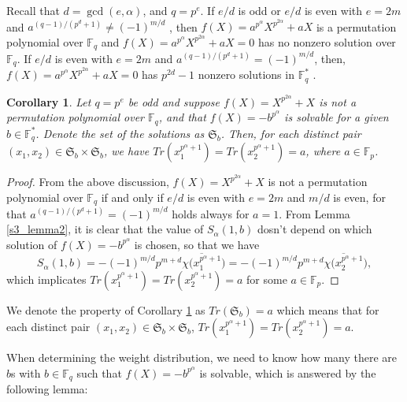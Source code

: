 \documentclass[final,1p,times]{elsarticle}
\newtheorem{sec3_cor1}[sec3_cor1x]{Corollary}
\begin{document}
  Recall that $ d=\gcd(e,\alpha) $, and $ q=p^{e} $. If $ e/d $ is odd or $ e/d $ is even with $ e=2m $ and  $ a^{(q-1)/(p^{d}+1)}\ne (-1)^{m/d} $ , then $ f(X)=a^{p^{\alpha}}X^{p^{2\alpha}} +aX$ is a permutation polynomial over $ \mathbb{F}_{q} $ and $ f(X)=a^{p^{\alpha}}X^{p^{2\alpha}} +aX=0 $ has no nonzero solution over $ \mathbb{F}_{q} $. If $ e/d $ is even with $ e=2m $ and  $ a^{(q-1)/(p^{d}+1)}= (-1)^{m/d} $, then, $ f(X)=a^{p^{\alpha}}X^{p^{2\alpha}} +aX=0 $ has $ p^{2d}-1 $ nonzero solutions in $ \mathbb{F}_{q}^{*} $ \cite[Theorem 4.1]{Bib9}.
  
  \begin{sec3_cor1}\label{s3_cor1}
  Let $ q=p^{e} $ be odd and suppose $ f(X)=X^{p^{2\alpha}} +X$ is not a permutation polynomial over $ \mathbb{F}_{q} $, and that $ f(X)=- b^{p^{\alpha}}$ is solvable for a given $ b\in \mathbb{F}_{q}^{*} $. Denote the set of the solutions as $ \mathfrak{S}_{b} $. Then, for each distinct pair $ (x_{1},x_{2})\in \mathfrak{S}_{b}\times \mathfrak{S}_{b} $, we have $ Tr(x_{1}^{p^{\alpha}+1}) =Tr(x_{2}^{p^{\alpha}+1})=a$, where $ a\in \mathbb{F}_{p} $.
  \end{sec3_cor1}
  \begin{proof}
  From the above discussion, $ f(X)=X^{p^{2\alpha}} +X$ is not a permutation polynomial over $ \mathbb{F}_{q} $ if and only if  $ e/d $ is even with $ e=2m $ and $ m/d $ is even, for that $ a^{(q-1)/(p^{d}+1)}= (-1)^{m/d} $ holds always for $ a=1 $. From  Lemma \ref{s3_lemma2}, it is clear that the value of $ S_{\alpha}(1,b) $ dosn't depend on which solution of $ f(X)=- b^{p^{\alpha}}$ is chosen, so that we have 
  \begin{equation*}
 S_{\alpha}(1,b)=-(-1)^{m/d}p^{m+d}\overline{\chi(x_{1}^{p^{\alpha}+1}})= -(-1)^{m/d}p^{m+d}\overline{\chi(x_{2}^{p^{\alpha}+1}}),
  \end{equation*}
   which implicates  $ Tr(x_{1}^{p^{\alpha}+1}) =Tr(x_{2}^{p^{\alpha}+1}) =a$ for some $ a\in \mathbb{F}_{p} $.
  \end{proof}
  
  We denote the property of Corollary \ref{s3_cor1} as $ Tr(\mathfrak{S}_{b})=a $ which means that for each distinct pair $ (x_{1},x_{2})\in \mathfrak{S}_{b}\times \mathfrak{S}_{b} $, $ Tr(x_{1}^{p^{\alpha}+1}) =Tr(x_{2}^{p^{\alpha}+1})=a$.
  
  When determining the weight distribution, we need to know how many there are $ b $s with $ b\in  \mathbb{F}_{q} $ such that $ f(X)=- b^{p^{\alpha}}$ is solvable, which is answered by the following lemma:
  
\end{document}

